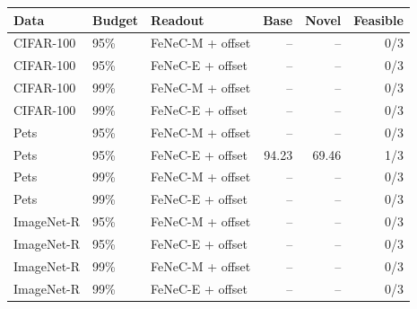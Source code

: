 \begin{tabular}{lllrrr}
\toprule
Data & Budget & Readout & Base & Novel & Feasible \\
\midrule
CIFAR-100 & 95\% & FeNeC-M + offset & -- & -- & 0/3 \\
CIFAR-100 & 95\% & FeNeC-E + offset & -- & -- & 0/3 \\
CIFAR-100 & 99\% & FeNeC-M + offset & -- & -- & 0/3 \\
CIFAR-100 & 99\% & FeNeC-E + offset & -- & -- & 0/3 \\
\midrule
Pets & 95\% & FeNeC-M + offset & -- & -- & 0/3 \\
Pets & 95\% & FeNeC-E + offset & 94.23 & 69.46 & 1/3 \\
Pets & 99\% & FeNeC-M + offset & -- & -- & 0/3 \\
Pets & 99\% & FeNeC-E + offset & -- & -- & 0/3 \\
\midrule
ImageNet-R & 95\% & FeNeC-M + offset & -- & -- & 0/3 \\
ImageNet-R & 95\% & FeNeC-E + offset & -- & -- & 0/3 \\
ImageNet-R & 99\% & FeNeC-M + offset & -- & -- & 0/3 \\
ImageNet-R & 99\% & FeNeC-E + offset & -- & -- & 0/3 \\
\bottomrule
\end{tabular}
